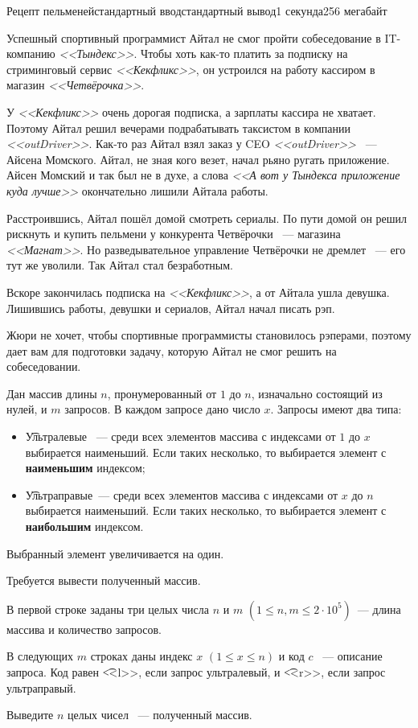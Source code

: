 \begin{problem}{Рецепт пельменей}{стандартный ввод}{стандартный вывод}{1 секунда}{256 мегабайт}

Успешный спортивный программист Айтал не смог пройти собеседование в IT-компанию \textit{<<Тындекс>>}. Чтобы хоть как-то платить за подписку на стриминговый сервис \textit{<<Кекфликс>>}, он устроился на работу кассиром в магазин \textit{<<Четвёрочка>>}.

У \textit{<<Кекфликс>>} очень дорогая подписка, а зарплаты кассира не хватает. Поэтому Айтал решил вечерами подрабатывать таксистом в компании \textit{<<outDriver>>}. Как-то раз Айтал взял заказ у CEO \textit{<<outDriver>>} ~--- Айсена Момского. Айтал, не зная кого везет, начал рьяно ругать приложение. Айсен Момский и так был не в духе, а слова \textit{<<А вот у Тындекса приложение куда лучше>>} окончательно лишили Айтала работы.

Расстроившись, Айтал пошёл домой смотреть сериалы. По пути домой он решил рискнуть и купить пельмени у конкурента Четвёрочки ~--- магазина \textit{<<Магнат>>}. Но разведывательное управление Четвёрочки не дремлет ~--- его тут же уволили. Так Айтал стал безработным. 

Вскоре закончилась подписка на \textit{<<Кекфликс>>}, а от Айтала ушла девушка. Лишившись работы, девушки и сериалов, Айтал начал писать рэп. 

Жюри не хочет, чтобы спортивные программисты становилось рэперами, поэтому дает вам для подготовки задачу, которую Айтал не смог решить на собеседовании.

Дан массив длины $n$, пронумерованный от $1$ до $n$, изначально состоящий из нулей, и $m$ запросов. В каждом запросе дано число $x$. Запросы имеют два типа:
\begin{itemize}
  \item \t{Ультралевые} ~--- среди всех элементов массива с индексами от $1$ до $x$ выбирается наименьший. Если таких несколько, то выбирается элемент с \textbf{наименьшим} индексом;
  \item \t{Ультраправые}~--- среди всех элементов массива с индексами от $x$ до $n$ выбирается наименьший. Если таких несколько, то выбирается элемент с \textbf{наибольшим} индексом.
\end{itemize}
Выбранный элемент увеличивается на один.

Требуется вывести полученный массив.

\InputFile
В первой строке заданы три целых числа $n$ и $m$ $(1 \le n, m \le 2 \cdot 10^5)$~--- длина массива и количество запросов.

В следующих $m$ строках даны индекс $x$ $(1 \le x \le n)$ и код $c$ ~--- описание запроса. Код равен \t{<<l>>}, если запрос ультралевый, и \t{<<r>>}, если запрос ультраправый.

\OutputFile
Выведите $n$ целых чисел ~--- полученный массив.

\Examples

\begin{example}
%
%
\end{example}

\end{problem}

